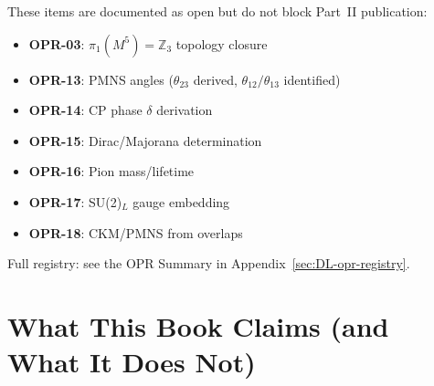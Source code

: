\begin{tcolorbox}[colback=yellow!5!white, colframe=yellow!50!black,
    title=\textbf{Non-Blocking for Part II Zenodo (Scope-Guarded)}]

These items are documented as open but do not block Part~II publication:

\begin{itemize}[nosep]
    \item \textbf{OPR-03}: $\pi_1(M^5) = \mathbb{Z}_3$ topology closure
    \item \textbf{OPR-13}: PMNS angles ($\theta_{23}$ derived, $\theta_{12}/\theta_{13}$ identified)
    \item \textbf{OPR-14}: CP phase $\delta$ derivation
    \item \textbf{OPR-15}: Dirac/Majorana determination
    \item \textbf{OPR-16}: Pion mass/lifetime
    \item \textbf{OPR-17}: SU(2)$_L$ gauge embedding
    \item \textbf{OPR-18}: CKM/PMNS from overlaps
\end{itemize}

Full registry: see the OPR Summary in Appendix~\ref{sec:DL-opr-registry}.
\end{tcolorbox}


\section{What This Book Claims (and What It Does Not)}
\label{sec:ch20_claims}

